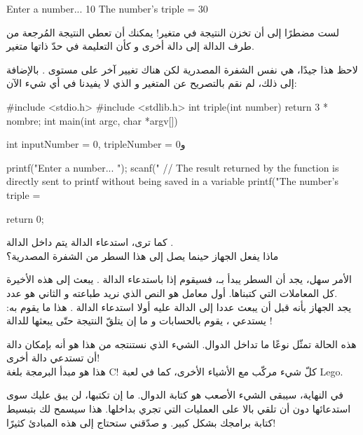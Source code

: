 \begin{Console}
Enter a number... 10
The number's triple = 30
\end{Console}

\begin{information}
لست مضطرًا إلى أن تخزن النتيجة في متغير! يمكنك أن تعطي النتيجة المُرجعة من طرف الدالة 
إلى دالة أخرى و كأن التعليمة
في حدّ ذاتها متغير.
\end{information}
لاحظ هذا جيدًا، هي نفس الشفرة المصدرية لكن هناك تغيير آخر على مستوى 
.
بالإضافة إلى ذلك، لم نقم بالتصريح عن المتغير 
و الذي لا يفيدنا في أي شيء الآن:

\begin{Csource}
#include <stdio.h>
#include <stdlib.h>
int triple(int number)
{
	return 3 * nombre;
}
int main(int argc, char *argv[])
{
	int inputNumber = 0, tripleNumber = 0و
	
	printf("Enter a number... ");
	scanf("%
	// The result returned by the function is directly sent to printf without being saved in a variable
	printf("The number's triple = %
	
	return 0;
}
\end{Csource}

كما ترى، استدعاء الدالة 
يتم داخل الدالة 
.\\
ماذا يفعل الجهاز حينما يصل إلى هذا السطر من الشفرة المصدرية؟

الأمر سهل، يجد أن السطر يبدأ بـ،
فسيقوم إذا باستدعاء الدالة 
.
يبعث إلى هذه الأخيرة كل المعاملات التي كتبناها. أول معامل هو النص الذي نريد طباعته و الثاني هو عدد.\\
يجد الجهاز بأنه قبل أن يبعث عددا إلى الدالة 
عليه أولا استدعاء الدالة 
.
هذا ما يقوم به: يستدعي 
،
يقوم بالحسابات و ما إن يتلقّ النتيجة حتّى يبعثها للدالة 
!

هذه الحالة تمثّل نوعًا ما تداخل الدوال. الشيء الذي نستنتجه من هذا هو أنه بإمكان دالة أن تستدعي دالة أخرى!\\
هذا هو مبدأ البرمجة بلغة
\textenglish{C}!
كلّ شيء مركّب مع الأشياء الأخرى، كما في لعبة
\textenglish{Lego}.

في النهاية، سيبقى الشيء الأصعب هو كتابة الدوال. ما إن تكتبها، لن يبق عليك سوى استدعائها دون أن تلقي بالا على العمليات التي تجري بداخلها. هذا سيسمح لك بتبسيط كتابة برامجك بشكل كبير. و صدّقني ستحتاج إلى هذه المبادئ كثيرًا!

